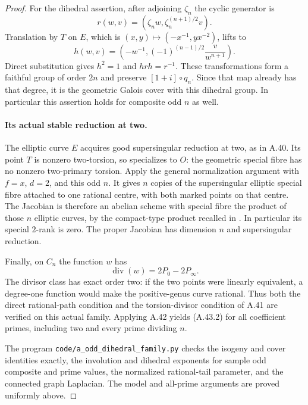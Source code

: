 \begin{proof}
For the dihedral assertion, after adjoining
\(\zeta_n\) the cyclic generator is
\[
 r(w,v)=(\zeta_n w,\zeta_n^{(n+1)/2}v).
\]
Translation by \(T\) on \(E\), which is
\((x,y)\mapsto(-x^{-1},y x^{-2})\), lifts to
\[
 h(w,v)=\left(-w^{-1},
           (-1)^{(n-1)/2}\frac{v}{w^{n+1}}\right).
                                                               \tag{A.43.9}
\]
Direct substitution gives \(h^2=1\) and
\(hrh=r^{-1}\). These transformations form a
faithful group of order \(2n\) and preserve
\([1+i]\circ q_n\). Since that map already has
that degree, it is the geometric Galois cover with
this dihedral group. In particular this assertion
holds for composite odd \(n\) as well.

\paragraph{Its actual stable reduction at two.}
The elliptic curve \(E\) acquires good supersingular
reduction at two, as in A.40. Its point \(T\) is
nonzero two-torsion, so specializes to \(O\): the
geometric special fibre has no nonzero two-primary
torsion. Apply the general normalization argument
with \(f=x\), \(d=2\), and this odd \(n\).
It gives \(n\) copies of the supersingular elliptic
special fibre attached to one rational centre, with
both marked points on that centre. The Jacobian is
therefore an abelian scheme with special fibre the
product of those \(n\) elliptic curves, by the
compact-type product recalled in
\cite[Section 1]{fghDupuyRabinoff}.
In particular its special \(2\)-rank is zero.
The proper Jacobian has dimension \(n\) and
supersingular reduction.

Finally, on \(C_n\) the function \(w\) has
\[
                  \operatorname{div}(w)=2P_0-2P_\infty.
                                                               \tag{A.43.10}
\]
The divisor class has exact order two: if the two
points were linearly equivalent, a degree-one function
would make the positive-genus curve rational.
Thus both the direct rational-path condition and
the torsion-divisor condition of A.41 are verified
on this actual family. Applying A.42 yields (A.43.2)
for all coefficient primes, including two and every
prime dividing \(n\).

The program \texttt{code/a\_odd\_dihedral\_family.py}
checks the isogeny and cover identities exactly,
the involution and dihedral exponents for sample
odd composite and prime values, the normalized
rational-tail parameter, and the connected graph
Laplacian. The model and all-prime arguments are
proved uniformly above.
\end{proof}
